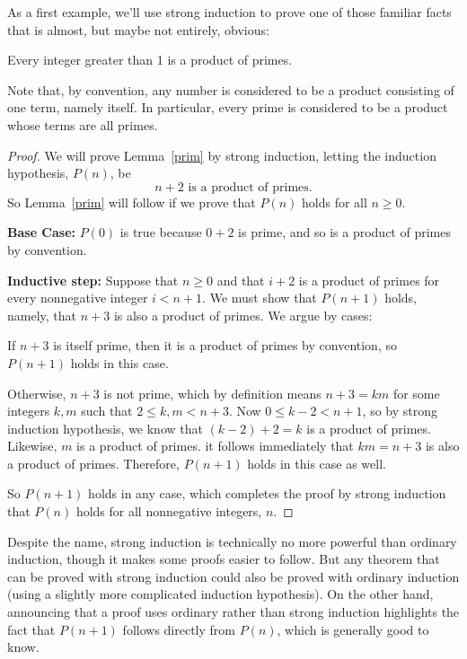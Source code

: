 As a first example, we'll use strong induction to prove one of those
familiar facts that is almost, but maybe not entirely, obvious:
\begin{lemma}\label{prim}
Every integer greater than 1 is a product of primes.
\end{lemma}
Note that, by convention, any number is considered to be a product
consisting of one term, namely itself.  In particular, every prime is
considered to be a product whose terms are all primes.

\begin{proof}

We will prove Lemma~\ref{prim} by strong induction, letting the induction
hypothesis, $P(n)$, be
\[
n+2 \text{ is a product of primes}.
\]
So Lemma~\ref{prim} will follow if we prove that $P(n)$ holds for all $n
\geq 0$.

\textbf{Base Case:} $P(0)$ is true because $0+2$ is prime, and so is a
product of primes by convention.

\textbf{Inductive step:} Suppose that $n \geq 0$ and that $i+2$ is a
product of primes for every nonnegative integer $i < n+1$.  We must show that
$P(n+1)$ holds, namely, that $n+3$ is also a product of primes.  We argue
by cases:

If $n+3$ is itself prime, then it is a product of primes by convention, so
$P(n+1)$ holds in this case.

Otherwise, $n + 3$ is not prime, which by definition means $n+3 = km$ for
some integers $k,m$ such that $2 \leq k,m < n+3$.  Now $0 \leq k-2 < n+1$,
so by strong induction hypothesis, we know that $(k-2)+2=k$ is a product of
primes.  Likewise, $m$ is a product of primes.  it follows immediately that
$km = n+3$ is also a product of primes.  Therefore, $P(n+1)$ holds in this
case as well.

So $P(n+1)$ holds in any case, which completes the proof by strong
induction that $P(n)$ holds for all nonnegative integers, $n$.

\end{proof}

Despite the name, strong induction is technically no more powerful than
ordinary induction, though it makes some proofs easier to follow.  But any
theorem that can be proved with strong induction could also be proved with
ordinary induction (using a slightly more complicated induction
hypothesis).  On the other hand, announcing that a proof uses ordinary
rather than strong induction highlights the fact that $P(n+1)$ follows
directly from $P(n)$, which is generally good to know.

